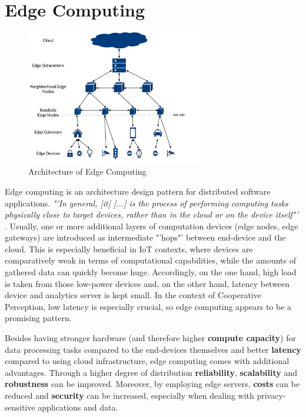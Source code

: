 \section{Edge Computing}
\label{sec:background:edge_computing}

\begin{figure}
	\centering
	\includegraphics[width=0.7\textwidth]{98_images/edge.png}
	\caption[Architecture of Edge Computing]{Architecture of Edge Computing \cite{Bischoff2019}}
	\label{fig:edge_computing}
\end{figure}

Edge computing is an architecture design pattern for distributed software applications. \textit{"'In general, [it] [...] is the process of performing computing tasks physically close to target devices, rather than in the cloud or on the device itself"'} \cite{Bischoff2019}. Usually, one or more additional layers of computation devices (edge nodes, edge gateways) are introduced as intermediate "'hops"' between end-device and the cloud. This is especially beneficial in IoT contexts, where devices are comparatively weak in terms of computational capabilities, while the amounts of gathered data can quickly become huge. Accordingly, on the one hand, high load is taken from those low-power devices and, on the other hand, latency between device and analytics server is kept small. In the context of Cooperative Perception, low latency is especially crucial, so edge computing appears to be a promising pattern.

Besides having stronger hardware (and therefore higher \textbf{compute capacity}) for data processing tasks compared to the end-devices themselves and better \textbf{latency} compared to using cloud infrastructure, edge computing comes with additional advantages. Through a higher degree of distribution \textbf{reliability}, \textbf{scalability} and \textbf{robustness} can be improved. Moreover, by employing edge servers, \textbf{costs} can be reduced and \textbf{security} can be increased, especially when dealing with privacy-sensitive applications and data. 

